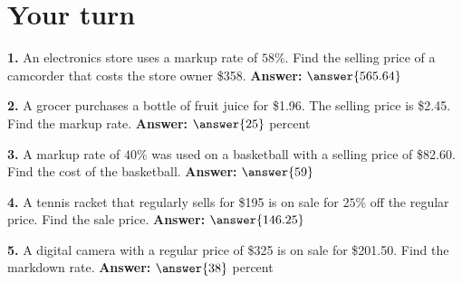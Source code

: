 \documentclass{ximera}
\begin{document}
\section*{Your turn}

\begin{problem}
\textbf{1.} An electronics store uses a markup rate of $58\%$. Find the selling price of a
camcorder that costs the store owner \$358. \qquad \textbf{Answer:} $\answer{565.64}$
\end{problem}

\begin{problem}
\textbf{2.} A grocer purchases a bottle of fruit juice for \$1.96. The selling price is
\$2.45. Find the markup rate. \qquad \textbf{Answer:} $\answer{25}$ percent
\end{problem}

\begin{problem}
\textbf{3.} A markup rate of $40\%$ was used on a basketball with a selling price of
\$82.60. Find the cost of the basketball. \qquad \textbf{Answer:} $\answer{59}$
\end{problem}

\begin{problem}
\textbf{4.} A tennis racket that regularly sells for \$195 is on sale for $25\%$ off the
regular price. Find the sale price. \qquad \textbf{Answer:} $\answer{146.25}$
\end{problem}

\begin{problem}
\textbf{5.} A digital camera with a regular price of \$325 is on sale for \$201.50. Find
the markdown rate. \qquad \textbf{Answer:} $\answer{38}$ percent
\end{problem}
\end{document}

